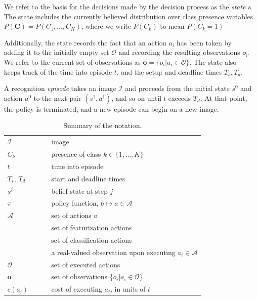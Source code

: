 We refer to the basis for the decisions made by the decision process as the \emph{state} $s$.
The state includes the currently believed distribution over class presence variables $P(\mathbf{C}) = P(C_1, \dots, C_K)$, where we write $P(C_k)$ to mean $P(C_k=1)$

Additionally, the state records the fact that an action $a_i$ has been taken by adding it to the initially empty set $\mathcal{O}$ and recording the resulting observations $o_i$.
We refer to the current set of observations as $\mathbf{o} = \{o_i | a_i \in \mathcal{O}\}$.
The state also keeps track of the time into episode $t$, and the setup and deadline times $T_s,T_d$.

A recognition \emph{episode} takes an image $\mathcal{I}$ and proceeds from the initial state $s^0$ and action $a^0$ to the next pair $(s^1,a^1)$, and so on until $t$ exceeds $T_d$.
At that point, the policy is terminated, and a new episode can begin on a new image.

\begin{table}[h!]
\centering
\caption{Summary of the notation.}
\label{tab:notation}
\begin{tabular}{|l|l|}
  \hline
  $\mathcal{I}$ & image \\
  $C_k$         & presence of class $k \in \{1,\dots,K\}$ \\ 
  $t$           & time into episode \\ 
  $T_s$, $T_d$  & start and deadline times \\ 
  $s^j$         & belief state at step $j$ \\ 
  $\pi$         & policy function, $b \mapsto a \in \mathcal{A}$ \\
  $\mathcal{A}$ & set of actions $a$\\ 
  \comment{$\mathcal{F}$ & set of featurization actions \\}
  \comment{$\mathcal{L}$ & set of classification actions\\}
  $o_i$         & a real-valued observation upon executing $a_i \in \mathcal{A}$\\
  $\mathcal{O}$ & set of executed actions\\
  $\mathbf{o}$  & set of observations $\{o_i | a_i \in \mathcal{O}\}$\\
  $c(a_i)$        & cost of executing $a_i$, in units of $t$\\
  \hline
\end{tabular}\end{table}

